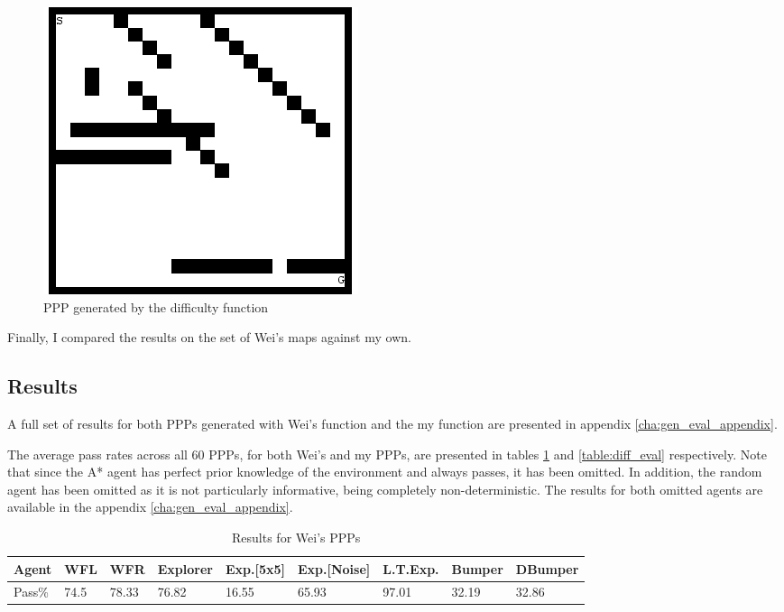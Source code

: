 \documentclass[authoryearcitations]{UoYCSproject}
\begin{document}
\begin{figure}
\graphicspath{ {EvalPics/} }
\includegraphics[scale=0.65]{openh_46.png}
\caption{PPP generated by the difficulty function}
\label{fig:difficulty_ppp}
\end{figure}

Finally, I compared the results on the set of Wei's maps against my own.

\subsection{Results}
\label{sec:gen_eval_results}

A full set of results for both PPPs generated with Wei's function and the my function are presented in appendix \ref{cha:gen_eval_appendix}.

The average pass rates across all 60 PPPs, for both Wei's and my PPPs, are presented in tables \ref{table:wei_eval} and \ref{table:diff_eval} respectively. Note that since the A* agent has perfect prior knowledge of the environment and always passes, it has been omitted. In addition, the random agent has been omitted as it is not particularly informative, being completely non-deterministic. The results for both omitted agents are available in the appendix \ref{cha:gen_eval_appendix}.
\begin{table}
\begin{tabular}{|l|l|l|l|l|l|l|l|l|}
\hline
Agent&WFL&WFR&Explorer&Exp.[5x5]&Exp.[Noise]&L.T.Exp.&Bumper&DBumper\\
\hline
Pass\%&74.5&78.33&76.82&16.55&65.93&97.01&32.19&32.86\\
\hline
\end{tabular}
\caption{Results for Wei's PPPs}
\label{table:wei_eval}
\end{table}
\end{document}
